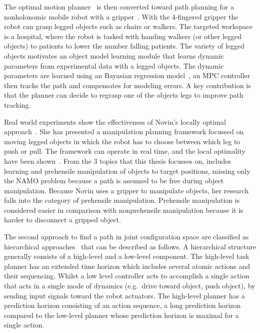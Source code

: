 The optimal motion planner~\cite{sabbaghnovin_optimal_2016} is then converted toward path planning for a nonholonomic mobile robot with a gripper~\cite{novin_dynamic_2018}. With the 4-fingered gripper the robot can grasp legged objects such as chairs or walkers. The targeted workspace is a hospital, where the robot is tasked with handing walkers (or other legged objects) to patients to lower the number falling patients. The variety of legged objects motivates an object model learning module that learns dynamic parameters from experimental data with a legged objects. The dynamic parameters are learned using an Bayasian regression model~\cite{scholz_navigation_2016}, an \ac{MPC} controller then tracks the path and compensates for modeling errors. A key contribution is that the planner can decide to regrasp one of the objects legs to improve path tracking.\bs

Real world experiments show the effectiveness of Novin's locally optimal approach~\cite{sabbaghnovin_model_2021}. She has presented a manipulation planning framework focussed on moving legged objects in which the robot has to choose between which leg to push or pull. The framework can operate in real time, and the local optimality have been shown~\cite{sabbaghnovin_model_2021}. From the 3 topics that this thesis focusses on, \citeauthor{sabbaghnovin_model_2021} includes learning and prehensile manipulation of objects to target positions, missing only the \ac{NAMO} problem because a path is assumed to be free during object manipulation. Because Novin uses a gripper to manipulate objects, her research falls into the category of prehensile manipulation. Prehensile manipulation is considered easier in comparison with nonprehensile manipulation because it is harder to disconnect a gripped object.\bs

The second approach to find a path in joint configuration space are classified as hierarchical approaches~\cite{vega-brown_asymptotically_2020,kaelbling_hierarchical_2011,scholz_navigation_2016,wang_affordancebased_2020} that can be described as follows. A hierarchical structure generally consists of a high-level and a low-level component. The high-level task planner has an extended time horizon which includes several atomic actions and their sequencing. Whilst a low level controller acts to accomplish a single action that acts in a single mode of dynamics (e.g.~drive toward object, push object), by sending input signals toward the robot actuators. The high-level planner has a prediction horizon consisting of an action sequence, a long prediction horizon compared to the low-level planner whose prediction horizon is maximal for a single action.\bs

